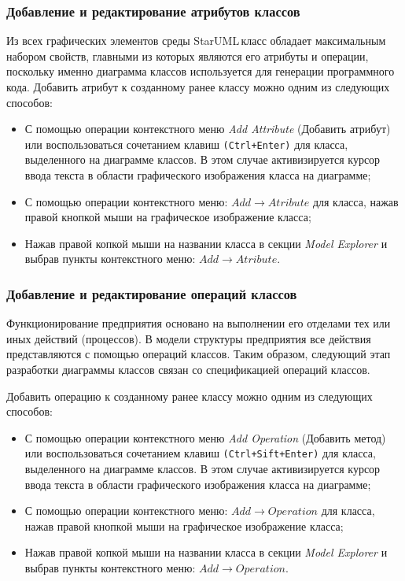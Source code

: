 \documentclass[a4paper,12pt]{report}
\newcommand{\staruml}{StarUML\,\tm}
\begin{document}
 
 
\subsubsection*{Добавление и редактирование атрибутов классов}
Из всех графических элементов среды \staruml класс обладает максимальным набором свойств, главными из которых являются его атрибуты и операции, поскольку именно диаграмма классов используется для генерации программного кода.
Добавить атрибут к созданному ранее классу можно одним из следующих способов:
\begin{itemize}
	\item С помощью операции контекстного меню \textit{Add Attribute} (Добавить атрибут) или воспользоваться сочетанием клавиш \texttt{(Ctrl+Enter)} для класса, выделенного на диаграмме классов. В этом случае активизируется курсор ввода текста в области графического изображения класса на диаграмме;
	\item С помощью операции контекстного меню: $Add \to Atribute$ для класса, нажав правой кнопкой мыши на графическое изображение класса;
	\item Нажав правой копкой мыши на названии класса в секции \textit{Model Explorer} и выбрав пункты контекстного меню: $Add \to Atribute$.
\end{itemize}


\subsubsection*{Добавление и редактирование операций классов}
Функционирование предприятия основано на выполнении его отделами тех или иных действий (процессов). В модели структуры предприятия все действия представляются с помощью операций классов. Таким образом, следующий этап разработки диаграммы классов связан со спецификацией операций классов.

Добавить операцию к созданному ранее классу можно одним из следующих способов:
\begin{itemize}
	\item С помощью операции контекстного меню \textit{Add Operation} (Добавить метод) или воспользоваться сочетанием клавиш \texttt{(Ctrl+Sift+Enter)} для класса, выделенного на диаграмме классов. В этом случае активизируется курсор ввода текста в области графического изображения класса на диаграмме;
	\item С помощью операции контекстного меню: $Add \to Operation$ для класса, нажав правой кнопкой мыши на графическое изображение класса;
	\item Нажав правой копкой мыши на названии класса в секции \textit{Model Explorer} и выбрав пункты контекстного меню: $Add \to Operation$.
\end{itemize}
\end{document}
